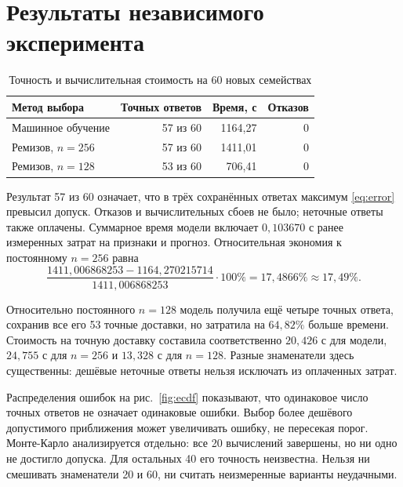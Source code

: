 \section{Результаты независимого эксперимента}
\begin{table}[!ht]\centering\caption{Точность и вычислительная стоимость на 60 новых семействах}\label{tab:main}
\begin{tabular}{lrrr}\toprule Метод выбора&Точных ответов&Время, с&Отказов\\\midrule
Машинное обучение&57 из 60&1164,27&0\\
Ремизов, $n=256$&57 из 60&1411,01&0\\
Ремизов, $n=128$&53 из 60&706,41&0\\\bottomrule\end{tabular}\end{table}
Результат 57 из 60 означает, что в трёх сохранённых ответах максимум \eqref{eq:error} превысил допуск. Отказов и вычислительных сбоев не было; неточные ответы также оплачены. Суммарное время модели включает $0{,}103670$ с ранее измеренных затрат на признаки и прогноз. Относительная экономия к постоянному $n=256$ равна
\begin{equation}\label{eq:saving}
\frac{1411{,}006868253-1164{,}270215714}{1411{,}006868253}\cdot100\%
=17{,}4866\%\approx17{,}49\%.
\end{equation}

\clearpage
Относительно постоянного $n=128$ модель получила ещё четыре точных ответа, сохранив все его 53 точные доставки, но затратила на $64{,}82\%$ больше времени. Стоимость на точную доставку составила соответственно $20{,}426$ с для модели, $24{,}755$ с для $n=256$ и $13{,}328$ с для $n=128$. Разные знаменатели здесь существенны: дешёвые неточные ответы нельзя исключать из оплаченных затрат.

Распределения ошибок на рис.~\ref{fig:ecdf} показывают, что одинаковое число точных ответов не означает одинаковые ошибки. Выбор более дешёвого допустимого приближения может увеличивать ошибку, не пересекая порог. Монте-Карло анализируется отдельно: все 20 вычислений завершены, но ни одно не достигло допуска. Для остальных 40 его точность неизвестна. Нельзя ни смешивать знаменатели 20 и 60, ни считать неизмеренные варианты неудачными.

